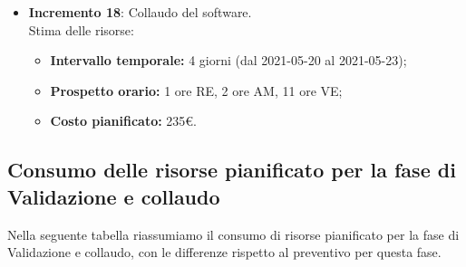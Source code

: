 \begin{itemize}
\item \textbf{Incremento 18}:
Collaudo del software.\\
Stima delle risorse:
\begin{itemize}
	\item \textbf{Intervallo temporale:} 4 giorni (dal 2021-05-20 al 2021-05-23);
	\item \textbf{Prospetto orario:} 1 ore RE, 2 ore AM, 11 ore VE;
	\item \textbf{Costo pianificato:} 235\euro.
\end{itemize}

\end{itemize}

\clearpage
\subsection{Consumo delle risorse pianificato per la fase di Validazione e collaudo}

Nella seguente tabella riassumiamo il consumo di risorse pianificato per la fase di Validazione e collaudo, con le differenze rispetto al preventivo per questa fase.

